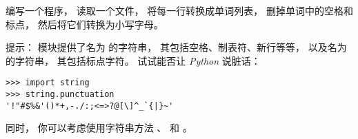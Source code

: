 \begin{exercise}


编写一个程序， 读取一个文件， 将每一行转换成单词列表， 删掉单词中的空格和标点， 然后将它们转换为小写字母。



提示： {\em {}} 模块提供了名为 {\em {}} 的字符串，
其包括空格、制表符、新行等等， 以及名为 {\em {}} 的字符串，
其包括标点字符。   试试能否让 {\em Python} 说脏话：

\begin{em}
\begin{lstlisting}
>>> import string
>>> string.punctuation
'!"#$%&'()*+,-./:;<=>?@[\]^_`{|}~'
\end{lstlisting}
\end{em}


同时， 你可以考虑使用字符串方法 {\em {}} 、 {\em {}} 和 {\em {}}。

\end{exercise}


